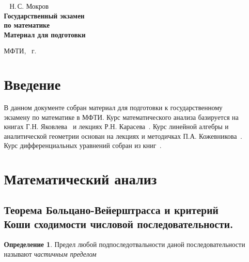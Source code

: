 \documentclass{urticle}
\theoremstyle{definition}
\newtheorem{definition}{Определение}
\begin{document}
\begin{titlepage}

    \begin{center}
        ~\vfill
        \Huge Н.\,С. Мокров\\[5mm]
        \Huge\textbf{Государственный экзамен\\по математике}\\[5mm]
        \LARGE\textbf{Материал для подготовки}
    \end{center}

    \vfill\vspace{2cm}
    \centerline{МФТИ, \the\year~г.}
\end{titlepage}

\thispagestyle{empty}
\tableofcontents
\newpage

\section*{Введение}
\label{Intro}
В данном документе собран материал для подготовки к государственному экзамену по математике в МФТИ. Курс математического анализа базируется на книгах Г.Н. Яковлева~\cite{Yakovlev} и лекциях Р.Н. Карасева~\cite{Karasev}. Курс линейной алгебры и аналитической геометрии основан на лекциях и методичках П.А. Кожевникова~\cite{Kozhevnikov}. Курс дифференциальных уравнений собран из книг~\cite{Diff1}.

\section{Математический анализ}
\label{MathAnalysis}

\subsection{Теорема Больцано-Вейерштрасса и критерий Коши сходимости числовой последовательности.}
    
    \begin{definition}
    \label{def:PartialLimit}
        Предел любой подпоследотвальности даной последовательности называют \textit{частичным пределом}
    \end{definition}    
    
\end{document}
